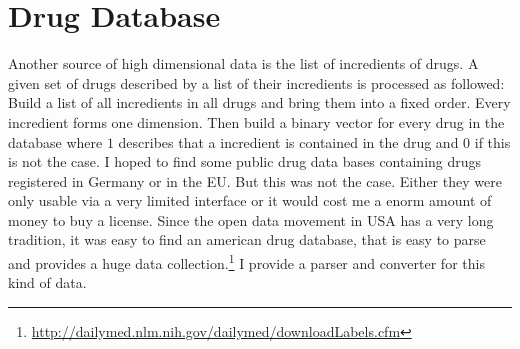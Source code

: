 \documentclass[%
	fontsize=11pt,%
	paper=a4,%
	pagesize,%
	twoside=false,%
	listof=totoc,%
	draft%
]{scrbook}
\begin{document}
\section{Drug Database}
Another source of high dimensional data is the list of incredients of drugs. A given set of drugs described by a list of their incredients is processed as followed: Build a list of all incredients in all drugs and bring them into a fixed order. Every incredient forms one dimension. Then build a binary vector for every drug in the database where $1$ describes that a incredient is contained in the drug and $0$ if this is not the case.
I hoped to find some public drug data bases containing drugs registered in Germany or in the EU. But this was not the case. Either they were only usable via a very limited interface or it would cost me a enorm amount of money to buy a license. Since the open data movement in USA has a very long tradition, it was easy to find an american drug database, that is easy to parse and provides a huge data collection.\footnote{\url{http://dailymed.nlm.nih.gov/dailymed/downloadLabels.cfm}} I provide a parser and converter for this kind of data.


\appendix


\backmatter

\listoffigures

\printnomenclature

\printglossaries

\cleardoublepage
{}
{}
\printbibliography
\end{document}
